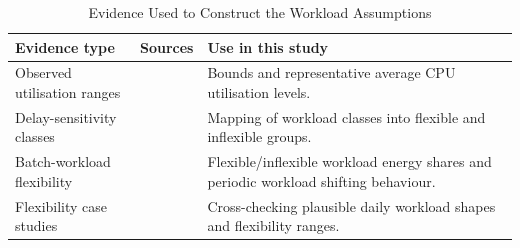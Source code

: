 \documentclass[lettersize,journal]{IEEEtran}
\newcommand{\rev}[1]{\textcolor{blue!70!black}{#1}}
\begin{document}
\begin{table}[!t]
\centering
\caption{\rev{Evidence Used to Construct the Workload Assumptions}}
\label{tab:workload-source-summary}
\begin{scriptsize}
\rev{%
\begin{tabular}{p{}p{}p{0.36\columnwidth}}
\toprule
\textbf{Evidence type} & \textbf{Sources} & \textbf{Use in this study} \\
\midrule
Observed utilisation ranges & \cite{Zaloumis2022IBM,Ghia2011McKinsey} & Bounds and representative average CPU utilisation levels. \\
Delay-sensitivity classes & \cite{6779441} & Mapping of workload classes into flexible and inflexible groups. \\
Batch-workload flexibility & \cite{Cao2022ApEn} & Flexible/inflexible workload energy shares and periodic workload shifting behaviour. \\
Flexibility case studies & \cite{Misaghian2023TIA,Xu2023SPIE,Zhou2024IJEPES,Fu2020ApEn,Liu2012PER} & Cross-checking plausible daily workload shapes and flexibility ranges. \\
\bottomrule
\end{tabular}}%
\end{scriptsize}
\end{table}
\end{document}
